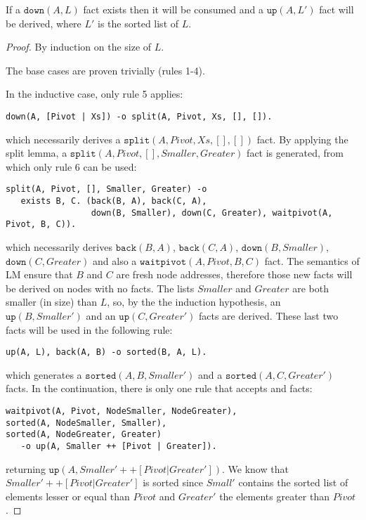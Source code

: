 \begin{theorem}

If a $\mathtt{down}(A, L)$ fact exists then it will be consumed and a
$\mathtt{up}(A, L')$ fact will be derived, where $L'$ is the sorted list of $L$.

\end{theorem}
\begin{proof}
By induction on the size of $L$.

The base cases are proven trivially (rules 1-4).

In the inductive case, only rule 5 applies:
\begin{Verbatim}[fontsize=\codesize]
down(A, [Pivot | Xs]) -o split(A, Pivot, Xs, [], []).
\end{Verbatim}

\noindent which necessarily derives a $\mathtt{split}(A, Pivot, Xs, [], [])$
fact. By applying the split lemma, a $\mathtt{split}(A, Pivot, [], Smaller, Greater)$
fact is generated, from which only rule 6 can be used:

\begin{Verbatim}[fontsize=\codesize]
split(A, Pivot, [], Smaller, Greater) -o
   exists B, C. (back(B, A), back(C, A),
                 down(B, Smaller), down(C, Greater), waitpivot(A, Pivot, B, C)).
\end{Verbatim}

\noindent which necessarily derives $\mathtt{back}(B, A)$, $\mathtt{back}(C,
A)$, $\mathtt{down}(B, Smaller)$, $\mathtt{down}(C, Greater)$ and also a
$\mathtt{waitpivot}(A, Pivot, B, C)$ fact. The semantics of LM ensure that $B$
and $C$ are fresh node addresses, therefore those new facts will be derived on
nodes with no facts. The lists $Smaller$ and $Greater$ are both smaller (in
size) than $L$, so, by the the induction hypothesis, an $\mathtt{up}(B,
Smaller')$ and an $\mathtt{up}(C, Greater')$ facts are derived. These last two
facts will be used in the following rule:

\begin{Verbatim}[fontsize=\codesize]
up(A, L), back(A, B) -o sorted(B, A, L).
\end{Verbatim}

\noindent which generates a $\mathtt{sorted}(A, B, Smaller')$ and a $\mathtt{sorted}(A, C,
Greater')$ facts. In the continuation, there is only one rule that accepts
 and  facts:

\begin{Verbatim}[fontsize=\codesize]
waitpivot(A, Pivot, NodeSmaller, NodeGreater),
sorted(A, NodeSmaller, Smaller),
sorted(A, NodeGreater, Greater)
   -o up(A, Smaller ++ [Pivot | Greater]).
\end{Verbatim}

\noindent returning $\mathtt{up}(A, Smaller' ++ [Pivot | Greater'])$.  We know that
$Smaller' ++ [Pivot | Greater']$ is sorted since $Small'$ contains the sorted
list of elements lesser or equal than $Pivot$ and $Greater'$ the elements
greater than $Pivot$.

\end{proof}

